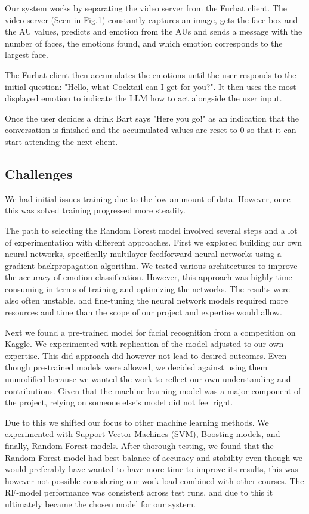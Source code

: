 \documentclass[conference]{IEEEtran}
\begin{document}
Our system works by separating the video server from the Furhat client. The video server (Seen in Fig.1) constantly captures an image,
gets the face box and the AU values, predicts and emotion from the AUs and sends a message with the number of faces, the emotions found, and which emotion corresponds to the largest face.

The Furhat client then accumulates the emotions until the user responds to the initial question: "Hello, what Cocktail can I get for you?".
It then uses the most displayed emotion to indicate the LLM how to act alongside the user input.

Once the user decides a drink Bart says "Here you go!" as an indication that the conversation is finished and the accumulated values are reset to 0 so that
it can start attending the next client.
\subsection{Challenges}
We had initial issues training due to the low ammount of data. However, once this was solved training progressed more steadily.


The path to selecting the Random Forest model involved several steps and a lot of experimentation with different approaches. First we explored building our own neural networks, specifically multilayer feedforward neural networks using a gradient backpropagation algorithm. We tested various architectures to improve the accuracy of emotion classification. However, this approach was highly time-consuming in terms of training and optimizing the networks. The results were also often unstable, and fine-tuning the neural network models required more resources and time than the scope of our project and expertise would allow.


Next we found a pre-trained model for facial recognition from a competition on Kaggle\cite{kaggle}. We experimented with replication of the model adjusted to our own expertise. This did approach did however not lead to desired outcomes. Even though pre-trained models were allowed, we decided against using them unmodified because we wanted the work to reflect our own understanding and contributions. Given that the machine learning model was a major component of the project, relying on someone else’s model did not feel right.

Due to this we shifted our focus to other machine learning methods. We experimented with Support Vector Machines (SVM), Boosting models, and finally, Random Forest models. After thorough testing, we found that the Random Forest model had best balance of accuracy and stability even though we would preferably have wanted to have more time to improve its results, this was however not possible considering our work load combined with other courses. The RF-model performance was consistent across test runs, and due to this it ultimately became the chosen model for our system.
\end{document}
